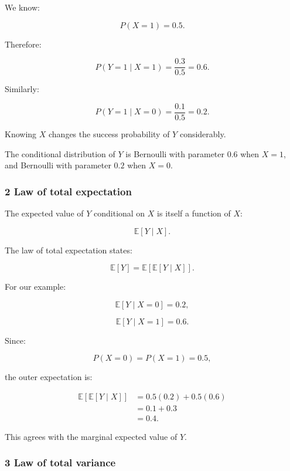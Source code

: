 \hypertarget{02-foundations-ii-ch023-conditional-distribution-from-our-joint-table}{}

We know:

\[
 P(X=1)=0.5.
\]

Therefore:

\[
 P(Y=1\mid X=1) = \frac{0.3}{0.5} =\boxed{0.6}.
\]

Similarly:

\[
 P(Y=1\mid X=0) = \frac{0.1}{0.5} =\boxed{0.2}.
\]

Knowing \(X\) changes the success probability of \(Y\) considerably.

The conditional distribution of \(Y\) is Bernoulli with parameter \(0.6\) when \(X=1\), and Bernoulli with parameter \(0.2\) when \(X=0\).

\subsubsection{2 Law of total expectation}\label{02-foundations-ii-ch023-law-of-total-expectation}

\hypertarget{02-foundations-ii-ch023-law-of-total-expectation}{}

The expected value of \(Y\) conditional on \(X\) is itself a function of \(X\):

\[
 \mathbb E[Y\mid X].
\]

The law of total expectation states:

\[
 \boxed{ \mathbb E[Y]= \mathbb E[\mathbb E[Y\mid X]] }.
\]

For our example:

\[
 \mathbb E[Y\mid X=0]=0.2,
\]

\[
 \mathbb E[Y\mid X=1]=0.6.
\]

Since:

\[
 P(X=0)=P(X=1)=0.5,
\]

the outer expectation is:

\[
 \begin{aligned} \mathbb E[\mathbb E[Y\mid X]] &=0.5(0.2)+0.5(0.6)\\ &=0.1+0.3\\ &=\boxed{0.4}. \end{aligned}
\]

This agrees with the marginal expected value of \(Y\).

\subsubsection{3 Law of total variance}\label{02-foundations-ii-ch023-law-of-total-variance}

